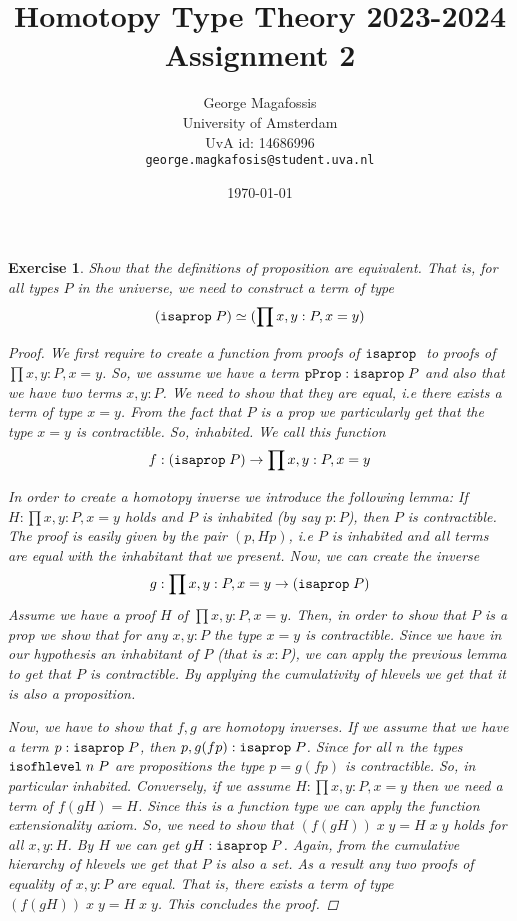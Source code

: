 \documentclass[10pt]{article}
\title{Homotopy Type Theory 2023-2024\\
       Assignment 2
      }
\date{\today}
\author{George Magafossis \\
University of Amsterdam \\
UvA id: 14686996 \\
\texttt{george.magkafosis@student.uva.nl}}
\newtheorem{exercise}{Exercise}
\begin{document}
\maketitle

\begin{exercise}
Show that the definitions of proposition are equivalent.
That is, for all types $P$ in the universe, we need
to construct a term of type
\[
 (\mathtt{isaprop \;} P) \simeq (\prod x, y : P, x = y)
\]
\begin{proof}
We first require to create a function from proofs
of $\mathtt{isaprop \;}$ to proofs of $\prod x, y : P, x = y$.
So, we assume we have a term $\mathtt{pProp}
: \mathtt{isaprop \;} P$ and also that we have two terms
$x, y : P$. We need to show that they are equal,
i.e there exists a term of type $x = y$. From the
fact that $P$ is a prop we particularly get that
the type $x = y$ is contractible. So, inhabited.
We call this function
\[
 f : (\mathtt{isaprop \;} P) \to \prod x, y : P, x = y
\]

In order to create a homotopy inverse we introduce
the following lemma: If $H : \prod x, y : P, x = y$
holds and $P$ is inhabited (by say $p : P$), then
$P$ is contractible. The proof is easily given by
the pair $(p, H p)$, i.e $P$ is inhabited and all
terms are equal with the inhabitant that we present.
Now, we can create the inverse
\[
 g : \prod x, y : P, x = y \to (\mathtt{isaprop \;} P)
\]
Assume we have a proof $H$ of $\prod x, y : P, x = y$.
Then, in order to show that $P$ is a prop we show that
for any $x, y : P$ the type $x = y$ is contractible.
Since we have in our hypothesis an inhabitant of
$P$ (that is $x : P$), we can apply the previous
lemma to get that $P$ is contractible. By applying the
cumulativity of hlevels we get that it is also
a proposition.

Now, we have to show that $f, g$ are homotopy
inverses. If we assume that we have a term
$p : \mathtt{isaprop \;} P$, then $p, g (f p) : \mathtt{isaprop \;} P$.
Since for all $n$ the types $\mathtt{isofhlevel \;} n \; P$
are propositions the type $p = g (f p)$
is contractible. So, in particular inhabited.
Conversely, if we assume $H : \prod x, y : P, x = y$
then we need a term of $f (g H) = H$. Since
this is a function type we can apply the
function extensionality axiom. So, we need to show
that $(f (g H)) \; x \; y = H \; x \; y$ holds for all $x, y : H$.
By $H$ we can get $g H : \mathtt{isaprop \;} P$. Again, from
the cumulative hierarchy of hlevels we get that
$P$ is also a set. As a result any two proofs
of equality of $x, y : P$ are equal. That is,
there exists a term of type $(f (g H)) \; x \; y = H \; x \; y$.
This concludes the proof.
\end{proof}
\end{exercise}
\end{document}
